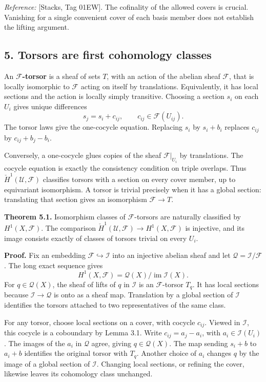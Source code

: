 \documentclass[11pt]{article}
\begin{document}
\emph{Reference:} {[}Stacks, Tag 01EW{]}. The cofinality of the allowed
covers is crucial. Vanishing for a single convenient cover of each basis
member does not establish the lifting argument.

\subsection{5. Torsors are first cohomology
classes}\label{torsors-are-first-cohomology-classes}

An \textbf{\(\mathcal F\)-torsor} is a sheaf of sets \(T\), with an
action of the abelian sheaf \(\mathcal F\), that is locally isomorphic
to \(\mathcal F\) acting on itself by translations. Equivalently, it has
local sections and the action is locally simply transitive. Choosing a
section \(s_i\) on each \(U_i\) gives unique differences \[
s_j=s_i+c_{ij},\qquad c_{ij}\in\mathcal F(U_{ij}).
\] The torsor laws give the one-cocycle equation. Replacing \(s_i\) by
\(s_i+b_i\) replaces \(c_{ij}\) by \(c_{ij}+b_j-b_i\).

Conversely, a one-cocycle glues copies of the sheaf
\(\mathcal F|_{U_i}\) by translations. The cocycle equation is exactly
the consistency condition on triple overlaps. Thus
\(\check H^1(\mathcal U,\mathcal F)\) classifies torsors with a section
on every cover member, up to equivariant isomorphism. A torsor is
trivial precisely when it has a global section: translating that section
gives an isomorphism \(\mathcal F\to T\).

\textbf{Theorem 5.1.} Isomorphism classes of \(\mathcal F\)-torsors are
naturally classified by \(H^1(X,\mathcal F)\). The comparison
\(\check H^1(\mathcal U,\mathcal F)\to H^1(X,\mathcal F)\) is injective,
and its image consists exactly of classes of torsors trivial on every
\(U_i\).

\textbf{Proof.} Fix an embedding \(\mathcal F\hookrightarrow\mathcal I\)
into an injective abelian sheaf and let
\(\mathcal Q=\mathcal I/\mathcal F\). The long exact sequence gives \[
H^1(X,\mathcal F)=\mathcal Q(X)/\operatorname{im}\mathcal I(X).
\] For \(q\in\mathcal Q(X)\), the sheaf of lifts of \(q\) in
\(\mathcal I\) is an \(\mathcal F\)-torsor \(T_q\). It has local
sections because \(\mathcal I\to\mathcal Q\) is onto as a sheaf map.
Translation by a global section of \(\mathcal I\) identifies the torsors
attached to two representatives of the same class.

For any torsor, choose local sections on a cover, with cocycle
\(c_{ij}\). Viewed in \(\mathcal I\), this cocycle is a coboundary by
Lemma 3.1. Write \(c_{ij}=a_j-a_i\), with \(a_i\in\mathcal I(U_i)\). The
images of the \(a_i\) in \(\mathcal Q\) agree, giving
\(q\in\mathcal Q(X)\). The map sending \(s_i+b\) to \(a_i+b\) identifies
the original torsor with \(T_q\). Another choice of \(a_i\) changes
\(q\) by the image of a global section of \(\mathcal I\). Changing local
sections, or refining the cover, likewise leaves its cohomology class
unchanged.
\end{document}
